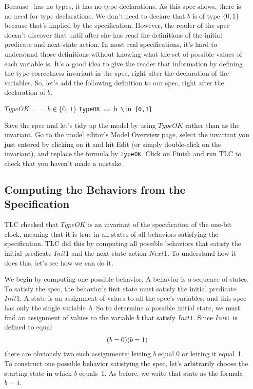 \documentclass[fleqn,leqno]{article}
\begin{document}
Because \tlaplus\ has no types, it has no type declarations.  As this
spec shows, there is no need for type declarations.  We don't need to
declare that $b$ is of type $\{0,1\}$ because that's implied by the
specification.  However, the reader of the spec doesn't discover that
until after she has read the definitions of the initial predicate and
next-state action.  In most real specifications, it's hard to
understand those definitions without knowing what the set of possible
values of each variable is.  It's a good idea to give the reader that
information by defining the 
type-correctness invariant in the spec,
right after the declaration of the variables.  So, let's add the
following definition to our spec, right after the declaration of $b$.
\begin{display}
\begin{twocols}
$TypeOK == b \in \{0,\,1\}$
\midcol
\verb|TypeOK == b \in {0,1}|
\end{twocols}
\end{display}
Save the spec and let's tidy up the model by using $TypeOK$ rather
than  as the invariant.  Go to the model
editor's \textsf{Model Overview} page, select the invariant you just
entered by clicking on it and hit \textsf{Edit} (or simply double-click on
the invariant), and replace the formula by \texttt{TypeOK}\@.  Click on
\textsf{Finish} and run TLC to check that you haven't made a mistake.

  \vspace{-\baselineskip}%
\subsection{Computing the Behaviors from the Specification}

TLC checked that $TypeOK$ is an invariant of the specification of
the one-bit clock, meaning that it is true in all states of all
behaviors satisfying the specification.  TLC did this by computing
all possible behaviors that satisfy the initial predicate $Init1$ and
the next-state action $Next1$.  To understand how it does this, let's
see how we can do it.

We begin by computing one possible behavior.  A behavior is a sequence
of states.  To satisfy
the spec, the behavior's first state must satisfy the initial predicate
$Init1$.
A state is an assignment of values to all the spec's
variables, and this spec has only the single variable~$b$.  So to determine
a possible initial state, we must find an assignment of values to the
variable $b$ that satisfy $Init1$.  Since $Init1$ is defined to equal
 \[ (b=0) \/ (b=1) \]
there are obviously two such assignments: letting $b$ equal 0 or
letting it equal~1.  To construct one possible behavior satisfying the
spec, let's arbitrarily choose the starting state in which $b$
equals~1.  As before, we write that state as the formula $b=1$.
\end{document}
